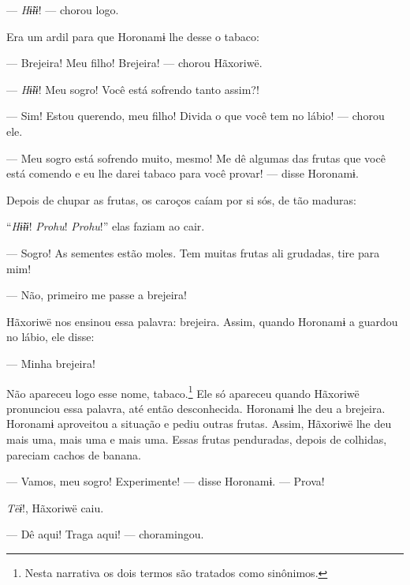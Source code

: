 --- \textit{Hɨ̃ɨɨ}! --- chorou logo. 

Era um ardil para que Horonamɨ lhe desse o tabaco: 

--- Brejeira! Meu filho! Brejeira! --- chorou Hãxoriwë. 

--- \textit{Hɨ̃ɨɨ}! Meu sogro! Você está sofrendo tanto assim?! 

--- Sim! Estou querendo, meu filho! Divida o que você tem no
lábio! --- chorou ele.

--- Meu sogro está sofrendo muito, mesmo! Me dê algumas das frutas que
você está comendo e eu lhe darei tabaco para você provar! --- disse
Horonamɨ. 


Depois de chupar as frutas, os caroços caíam por si sós, de tão maduras:

``\textit{Hɨ̃ɨɨ}! \textit{Prohu}! \textit{Prohu}!'' elas faziam ao cair. 

--- Sogro! As sementes estão moles. Tem muitas frutas ali grudadas, tire
para mim! 

--- Não, primeiro me passe a brejeira! 

Hãxoriwë nos ensinou essa palavra: brejeira. Assim, quando Horonamɨ a
guardou no lábio, ele disse: 

--- Minha brejeira! 

Não apareceu logo esse nome, tabaco.\footnote{Nesta narrativa os dois termos 
são tratados como sinônimos.}  Ele só apareceu
quando Hãxoriwë pronunciou essa palavra, até então desconhecida.
Horonamɨ lhe deu a brejeira. Horonamɨ aproveitou a situação e pediu
outras frutas. Assim, Hãxoriwë lhe deu mais uma, mais uma e mais uma.
Essas frutas penduradas, depois de colhidas, pareciam cachos de banana. 

--- Vamos, meu sogro! Experimente! --- disse Horonamɨ. --- Prova!

\textit{Tëɨ}!, Hãxoriwë caiu. 

--- Dê aqui! Traga aqui! --- choramingou. 



